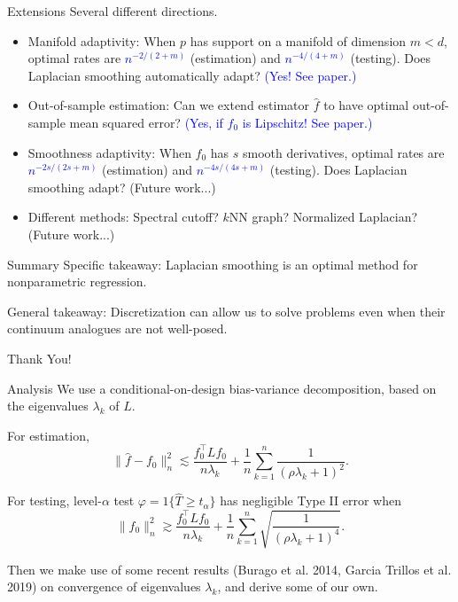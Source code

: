 \documentclass[xcolor=dvipsnames]{beamer}
\newcommand{\wh}[1]{\widehat{#1}}
\newcommand{\blue}[1]{\textcolor{blue}{#1}}
\begin{document}
\begin{frame}{Extensions}
Several different directions.
\begin{itemize}
	\item \alert{Manifold adaptivity}: When $p$ has support on a manifold of dimension $m < d$, optimal rates are \blue{$n^{-2/(2 + m)}$} (estimation) and \blue{$n^{-4/(4 + m)}$} (testing). Does Laplacian smoothing automatically adapt? \blue{(Yes! See paper.)} 
	\item \alert{Out-of-sample estimation}: Can we extend estimator $\wh{f}$ to have optimal out-of-sample mean squared error? \blue{(Yes, if $f_0$ is Lipschitz! See paper.)}
	\item \alert{Smoothness adaptivity}: When $f_0$ has $s$ smooth derivatives, optimal rates are \blue{$n^{-2s/(2s + m)}$} (estimation) and \blue{$n^{-4s/(4s + m)}$} (testing). Does Laplacian smoothing adapt? (Future work...)
	\item \alert{Different methods}: Spectral cutoff? $k$NN graph? Normalized Laplacian? (Future work...)
\end{itemize}
\end{frame}

\begin{frame}[t]{Summary}
	Specific takeaway: Laplacian smoothing is an optimal method for nonparametric regression. \newline
	
	General takeaway: Discretization can allow us to solve problems even when their continuum analogues are not well-posed.
	\newline 
	\newline
	\newline
	
	\begin{center}
	{\huge Thank You!}
	\end{center}
	
	
\end{frame}

\begin{frame}{Analysis}
We use a conditional-on-design \alert{bias-variance} decomposition, based on the eigenvalues $\lambda_k$ of $L$. \newline

For estimation,
\begin{equation*}
\|\wh{f} - f_0\|_n^2 \lesssim \frac{f_0^{\top} L f_0}{n\lambda_k} + \frac{1}{n} \sum_{k = 1}^{n} \frac{1}{(\rho \lambda_k + 1)^2}.
\end{equation*}

For testing, level-$\alpha$ test $\varphi = 1\{\wh{T} \geq t_{\alpha}\}$ has negligible Type II error when
\begin{equation*}
\|f_0\|_n^2 \gtrsim \frac{f_0^{\top} L f_0}{n\lambda_k} + \frac{1}{n} \sum_{k = 1}^{n} \sqrt{\frac{1}{(\rho \lambda_k + 1)^4}}.
\end{equation*}

Then we make use of some recent results (Burago et al. 2014, Garcia Trillos et al. 2019) on convergence of eigenvalues $\lambda_k$, and derive some of our own.
\end{frame}
\end{document}
